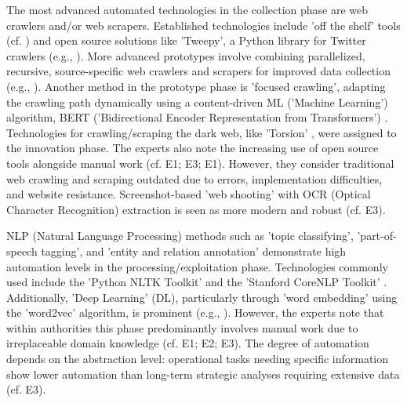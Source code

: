 \documentclass[10pt]{article}
\begin{document}
The most advanced automated technologies in the collection phase are web crawlers and/or web scrapers.
Established technologies include 'off the shelf' tools (cf. \cite{Middleton.2020}) and open source
solutions like 'Tweepy', a Python library for Twitter crawlers (e.g., \cite{Adewopo.2020}).
More advanced prototypes involve combining parallelized, recursive, source-specific web crawlers and scrapers for improved
data collection (e.g., \cite{Jenkins.2021}). Another method in the prototype phase is
'focused crawling', adapting the crawling path dynamically using a content-driven ML ('Machine Learning') algorithm, BERT ('Bidirectional Encoder Representation from Transformers')
\cite{Kuehn.2023}. Technologies for crawling/scraping the dark web, like 'Torsion' \cite{Sonawane.2022},
were assigned to the innovation phase. The experts also note the increasing use of open source tools alongside manual work
(cf. E1; E3; E1). However, they consider traditional web crawling and scraping
outdated due to errors, implementation difficulties, and website resistance. Screenshot-based 'web shooting' with
OCR (Optical Character Recognition) extraction is seen as more modern and robust (cf. E3).

NLP (Natural Language Processing) methods such as 'topic classifying', 'part-of-speech tagging', and 'entity and relation annotation'
demonstrate high automation levels in the processing/exploitation phase. Technologies commonly used include
the 'Python NLTK Toolkit' \cite{Hubbard.2022} and the 'Stanford CoreNLP Toolkit' \cite{Middleton.2020}.
Additionally, 'Deep Learning' (DL), particularly through 'word embedding' using the 'word2vec' algorithm, is prominent
(e.g., \cite{Bai.2020}). However, the experts note that within authorities this phase predominantly involves manual work due to irreplaceable domain knowledge
(cf. E1; E2; E3). The degree of automation depends on the abstraction level:
operational tasks needing specific information show lower automation than long-term strategic analyses requiring
extensive data (cf. E3).
\end{document}
